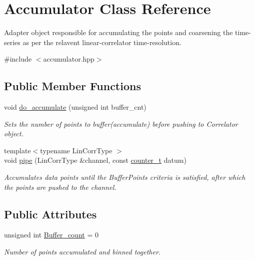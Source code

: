 \hypertarget{classAccumulator}{}\section{Accumulator Class Reference}
\label{classAccumulator}


Adapter object responsible for accumulating the points and coarsening the time-\/series as per the relavent linear-\/correlator time-\/resolution.  




{\ttfamily \#include $<$accumulator.\+hpp$>$}

\subsection*{Public Member Functions}
\begin{DoxyCompactItemize}
\item 
void \hyperlink{classAccumulator_adab342ee6d376a45ed38fe1e1679a1e2}{do\+\_\+accumulate} (unsigned int buffer\+\_\+cnt)
\begin{DoxyCompactList}\small\item\em Sets the number of points to buffer(accumulate) before pushing to Correlator object. \end{DoxyCompactList}\item 
{\footnotesize template$<$typename Lin\+Corr\+Type $>$ }\\void \hyperlink{classAccumulator_aa7494b569b7f4f2d2ab115e623ab135d}{pipe} (Lin\+Corr\+Type \&channel, const \hyperlink{types_8hpp_a22f279793847eba127de149437848c48}{counter\+\_\+t} datum)
\begin{DoxyCompactList}\small\item\em Accumulates data points until the Buffer\+Points criteria is satisfied, after which the points are pushed to the channel. \end{DoxyCompactList}\end{DoxyCompactItemize}
\subsection*{Public Attributes}
\begin{DoxyCompactItemize}
\item 
unsigned int \hyperlink{classAccumulator_a6e4595169413a77122fe56cdd39137ae}{Buffer\+\_\+count} = 0
\begin{DoxyCompactList}\small\item\em Number of points accumulated and binned together. \end{DoxyCompactList}\end{DoxyCompactItemize}
